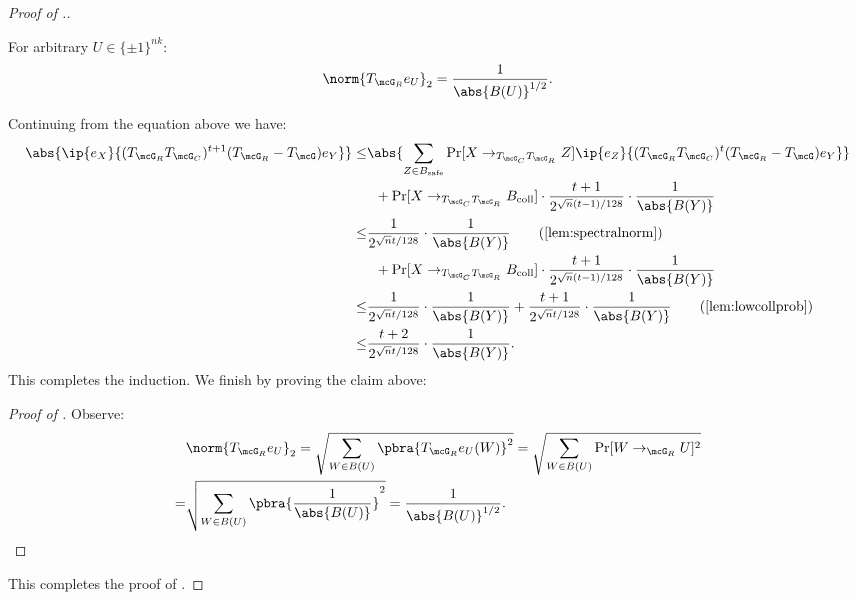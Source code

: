 \begin{proof}[Proof of .]
\begin{claim}\label{TGR eU 2 norm}
    For arbitrary $U \in \{\pm1\}^{nk}$:
\begin{equation*}
    \norm{T_{\mcG_R}e_U}_{2} = \frac{1}{\abs{B(U)}^{1/2}}.
\end{equation*}
\end{claim}

Continuing from the equation above we have:
\begin{align*}
    \abs{\ip{e_X}{(T_{\mcG_R}T_{\mcG_C})^{t+1}(T_{\mcG_R}-T_{\mcG}) e_Y}} \leq& \abs{\sum_{Z \in B_\text{safe}} \Pr[X \to_{T_{\mcG_C}T_{\mcG_R}} Z] \ip{e_Z}{(T_{\mcG_R}T_{\mcG_C})^t(T_{\mcG_R}-T_{\mcG}) e_Y}}\\
    &\;\;+ \Pr[X \to_{T_{\mcG_C}T_{\mcG_R}} B_{\text{coll}}] \cdot \frac{t+1}{2^{\sqrt{n}(t-1)/128}} \cdot \frac{1}{\abs{B(Y)}}\\
    \leq& \frac{1}{2^{\sqrt{n}t/128}} \cdot \frac{1}{\abs{B(Y)}} \tag{\Cref{lem:spectralnorm}}\\
    &\;\;+ \Pr[X \to_{T_{\mcG_C}T_{\mcG_R}} B_{\text{coll}}] \cdot \frac{t+1}{2^{\sqrt{n}(t-1)/128}} \cdot \frac{1}{\abs{B(Y)}}\\
    \leq& \frac{1}{2^{\sqrt{n}t/128}} \cdot \frac{1}{\abs{B(Y)}} + \frac{t+1}{2^{\sqrt{n}t/128}} \cdot \frac{1}{\abs{B(Y)}} \tag{\Cref{lem:lowcollprob}}\\
    \leq& \frac{t+2}{2^{\sqrt{n}t/128}} \cdot \frac{1}{\abs{B(Y)}}.
\end{align*}
This completes the induction. We finish by proving the claim above:

\begin{proof}[Proof of ]
    Observe:
    \begin{align*}
        &\norm{T_{\mcG_R}e_U}_{2} = \sqrt{\sum_{W \in B(U)} \pbra{T_{\mcG_R}e_U(W)}^2} = \sqrt{\sum_{W \in B(U)} \Pr[W \to_{\mcG_R} U]^2} \\
        =& \sqrt{\sum_{W \in B(U)} \pbra{\frac{1}{\abs{B(U)}}}^2} = \frac{1}{\abs{B(U)}^{1/2}}.\qedhere
    \end{align*}
\end{proof}
This completes the proof of .
\end{proof} 
